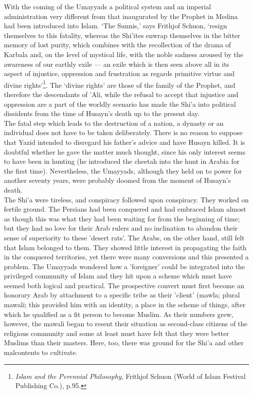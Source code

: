 \documentclass[10pt, twoside,openright]{book}
\begin{document}
With the coming of the Umayyads a political system and an imperial administration very different from 
that inaugurated by the Prophet in Medina had been introduced into Islam. `The Sunnis,' says Frithjof 
Schuon, `resign themselves to this fatality, whereas the Shi'ites enwrap themselves in the bitter 
memory of lost purity, which combines with the recollection of the drama of Karbala and, on the level 
of mystical life, with the noble sadness aroused by the awareness of our earthly exile --- an exile 
which is then seen above all in its aspect of injustice, oppression and frustration as regards 
primitive virtue and divine rights'\footnote{\emph{Islam and the Perennial Philosophy}, Frithjof Schuon (World of Islam Festival Publishing Co.), p.95.}. The `divine rights' are those of the family of the Prophet, 
and therefore the descendants of 'Ali, while the refusal to accept that injustice and oppression are 
a part of the worldly scenario has made the Shi'a into political dissidents from the time of Husayn's 
death up to the present day. \\

The fatal step which leads to the destruction of a nation, a dynasty or an individual does not have 
to be taken deliberately. There is no reason to suppose that Yazid intended to disregard his father's 
advice and have Husayn killed. It is doubtful whether he gave the matter much thought, since his only 
interest seems to have been in hunting (he introduced the cheetah into the hunt in Arabia for the 
first time). Nevertheless, the Umayyads, although they held on to power for another seventy years, 
were probably doomed from the moment of Husayn's death. \\

The Shi'a were tireless, and conspiracy followed upon conspiracy. They worked on fertile ground. The 
Persians had been conquered and had embraced Islam almost as though this was what they had been 
waiting for from the beginning of time; but they had no love for their Arab rulers and no inclination 
to abandon their sense of superiority to these 'desert rats'. The Arabs, on the other hand, still 
felt that Islam belonged to them. They showed little interest in propagating the faith in the 
conquered territories, yet there were many conversions and this presented a problem. The Umayyads 
wondered how a 'foreigner' could be integrated into the privileged community of Islam and they hit 
upon a scheme which must have seemed both logical and practical. The prospective convert must first 
become an honorary Arab by attachment to a specific tribe as their 'client' (mawla; plural mawali; 
this provided him with an identity, a place in the scheme of things, after which he qualified as a 
fit person to become Muslim. As their numbers grew, however, the mawali began to resent their 
situation as second\hyp{}class citizens of the religious community and some at least must have felt that 
they were better Muslims than their masters. Here, too, there was ground for the Shi'a and other 
malcontents to cultivate. \\
\end{document}
